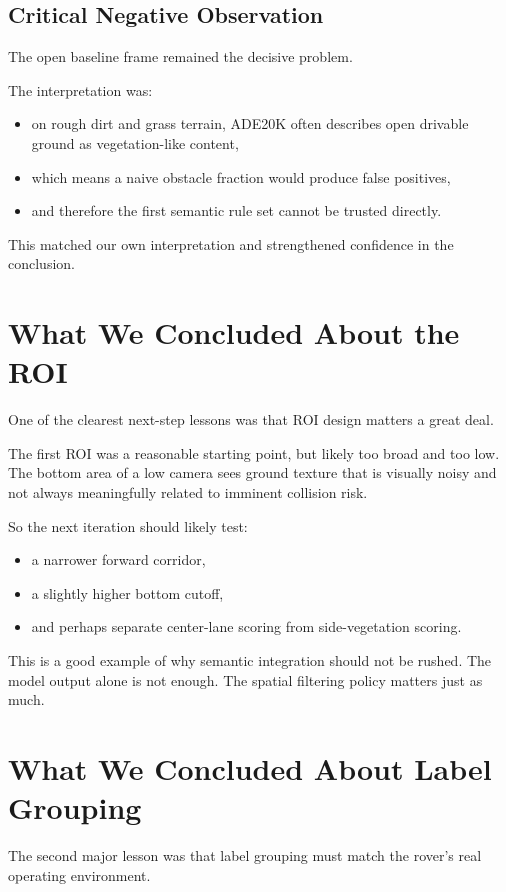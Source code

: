 \documentclass[11pt]{article}
\begin{document}
\subsection{Critical Negative Observation}
The open baseline frame remained the decisive problem.

The interpretation was:
\begin{itemize}[leftmargin=*]
\item on rough dirt and grass terrain, ADE20K often describes open drivable ground as vegetation-like content,
\item which means a naive obstacle fraction would produce false positives,
\item and therefore the first semantic rule set cannot be trusted directly.
\end{itemize}

This matched our own interpretation and strengthened confidence in the conclusion.

\section{What We Concluded About the ROI}
One of the clearest next-step lessons was that ROI design matters a great deal.

The first ROI was a reasonable starting point, but likely too broad and too low. The bottom area of a low camera sees ground texture that is visually noisy and not always meaningfully related to imminent collision risk.

So the next iteration should likely test:
\begin{itemize}[leftmargin=*]
\item a narrower forward corridor,
\item a slightly higher bottom cutoff,
\item and perhaps separate center-lane scoring from side-vegetation scoring.
\end{itemize}

This is a good example of why semantic integration should not be rushed. The model output alone is not enough. The spatial filtering policy matters just as much.

\section{What We Concluded About Label Grouping}
The second major lesson was that label grouping must match the rover's real operating environment.
\end{document}
